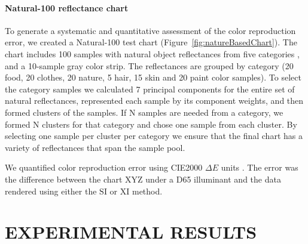 \documentclass[]{spie}
\newcommand{\XI}{\mathrm{XI}}
\newcommand{\SI}{\mathrm{SI}}
\begin{document}
\paragraph{Natural-100 reflectance chart} To generate a systematic and quantitative assessment of the color reproduction error, we created a Natural-100 test chart (Figure~\ref{fig:natureBasedChart}). The chart includes 100 samples with natural object reflectances from five categories \cite{Vrhel1994}, and a 10-sample gray color strip. The reflectances are grouped by category (20 food, 20 clothes, 20 nature, 5 hair, 15 skin and 20 paint color samples). To select the category samples we calculated 7 principal components for the entire set of natural reflectances, represented each sample by its component weights, and then formed clusters of the samples. If N samples are needed from a category, we formed N clusters for that category and chose one sample from each cluster. By selecting one sample per cluster per category we ensure that the final chart has a variety of reflectances that span the sample pool.

We quantified color reproduction error using CIE2000 $\Delta E$ units \cite{Sharma2005}. The error was the difference between the chart XYZ under a D65 illuminant and the data rendered using either the $\SI$ or $\XI$ method.

\section{EXPERIMENTAL RESULTS}
\end{document}
